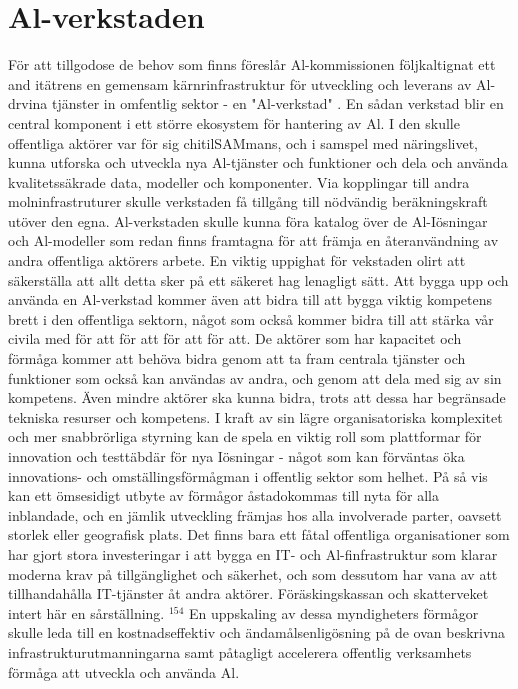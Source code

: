 {{{{{{{{{{{{{{{\section*{Al-verkstaden}
För att tillgodose de behov som finns föreslår Al-kommissionen följkaltignat ett and itätrens en gemensam kärnrinfrastruktur för utveckling och leverans av Al-drvina tjänster in omfentlig sektor - en "Al-verkstad" . En sådan verkstad blir en central komponent i ett större ekosystem för hantering av Al. I den skulle offentliga aktörer var för sig chitilSAMmans, och i samspel med näringslivet, kunna utforska och utveckla nya Al-tjänster och funktioner och dela och använda kvalitetssäkrade data, modeller och komponenter. Via kopplingar till andra molninfrastruturer skulle verkstaden få tillgång till nödvändig beräkningskraft utöver den egna. Al-verkstaden skulle kunna föra katalog över de Al-Iösningar och Al-modeller som redan finns framtagna för att främja en återanvändning av andra offentliga aktörers arbete. En viktig uppighat för vekstaden olirt att säkerställa att allt detta sker på ett säkeret hag lenagligt sätt. Att bygga upp och använda en Al-verkstad kommer även att bidra till att bygga viktig kompetens brett i den offentliga sektorn, något som också kommer bidra till att stärka vår civila med för att för att för att för att.
De aktörer som har kapacitet och förmåga kommer att behöva bidra genom att ta fram centrala tjänster och funktioner som också kan användas av andra, och genom att dela med sig av sin kompetens. Även mindre aktörer ska kunna bidra, trots att dessa har begränsade tekniska resurser och kompetens. I kraft av sin lägre organisatoriska komplexitet och mer snabbrörliga styrning kan de spela en viktig roll som plattformar för innovation och testtäbdär för nya Iösningar - något som kan förväntas öka innovations- och omställingsförmågman i offentlig sektor som helhet. På så vis kan ett ömsesidigt utbyte av förmågor åstadokommas till nyta för alla inblandade, och en jämlik utveckling främjas hos alla involverade parter, oavsett storlek eller geografisk plats.
Det finns bara ett fåtal offentliga organisationer som har gjort stora investeringar i att bygga en IT- och Al-finfrastruktur som klarar moderna krav på tillgänglighet och säkerhet, och som dessutom har vana av att tillhandahålla IT-tjänster åt andra aktörer. Föräskingskassan och skatterveket intert här en sårställning. \({ }^{154}\) En uppskaling av dessa myndigheters förmågor skulle leda till en kostnadseffektiv och ändamålsenligösning på de ovan beskrivna infrastrukturutmanningarna samt påtagligt accelerera offentlig verksamhets förmåga att utveckla och använda Al.

}}}}}}}}}}}}}}}
